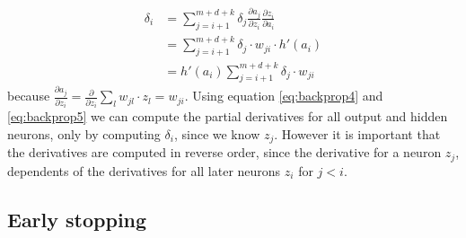\documentclass[11pt]{article}
\begin{document}
\begin{equation} \label{eq:backprop5}
\begin{split}
    \delta_{i} &= \sum_{j = i + 1}^{m + d + k} \delta_{j} \frac{\partial a_{j}}{\partial z_{i}} \frac{\partial z_{i}}{\partial a_{i}} \\
    &= \sum_{j = i + 1}^{m + d + k} \delta_{j} \cdot w_{ji} \cdot h'(a_{i}) \\
    &= h'(a_{i}) \sum_{j = i + 1}^{m + d + k} \delta_{j} \cdot w_{ji}
\end{split}
\end{equation}
because $\frac{\partial a_{j}}{\partial z_{i}} = \frac{\partial}{\partial z_{i}} \sum_{l} w_{jl} \cdot z_{l} = w_{ji}$. Using equation \ref{eq:backprop4} and \ref{eq:backprop5} we can compute the partial derivatives for all output and hidden neurons, only by computing $\delta_{i}$, since we know $z_{j}$. However it is important that the derivatives are computed in reverse order, since the derivative for a neuron $z_{j}$, dependents of the derivatives for all later neurons $z_{i}$ for $j < i$.

\subsection{Early stopping}
\end{document}
